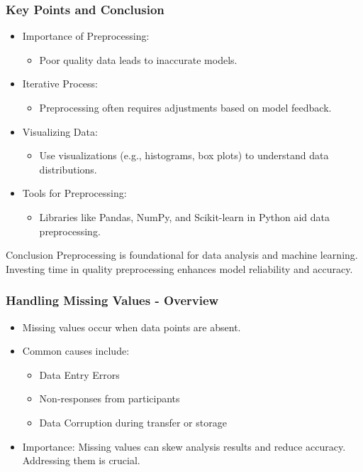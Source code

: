 \documentclass[aspectratio=169]{beamer}
\begin{document}
\begin{frame}[fragile]
    \frametitle{Key Points and Conclusion}
    \begin{itemize}
        \item Importance of Preprocessing: 
            \begin{itemize}
                \item Poor quality data leads to inaccurate models.
            \end{itemize}
        \item Iterative Process: 
            \begin{itemize}
                \item Preprocessing often requires adjustments based on model feedback.
            \end{itemize}
        \item Visualizing Data: 
            \begin{itemize}
                \item Use visualizations (e.g., histograms, box plots) to understand data distributions.
            \end{itemize}
        \item Tools for Preprocessing: 
            \begin{itemize}
                \item Libraries like Pandas, NumPy, and Scikit-learn in Python aid data preprocessing.
            \end{itemize}
    \end{itemize}

    \begin{block}{Conclusion}
        Preprocessing is foundational for data analysis and machine learning. Investing time in quality preprocessing enhances model reliability and accuracy.
    \end{block}
\end{frame}

\begin{frame}[fragile]
    \frametitle{Handling Missing Values - Overview}
    \begin{itemize}
        \item Missing values occur when data points are absent.
        \item Common causes include:
        \begin{itemize}
            \item Data Entry Errors
            \item Non-responses from participants
            \item Data Corruption during transfer or storage
        \end{itemize}
        \item Importance: Missing values can skew analysis results and reduce accuracy. Addressing them is crucial.
    \end{itemize}
\end{frame}
\end{document}
